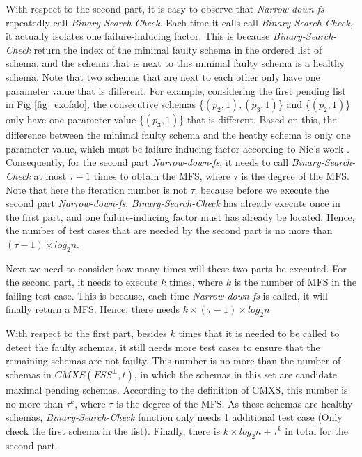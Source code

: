 \documentclass{sig-alternate-05-2015}
\begin{document}
{{{With respect to the second part, it is easy to observe that \emph{Narrow-down-fs} repeatedly call \emph{Binary-Search-Check}. Each time it calls call \emph{Binary-Search-Check}, it actually isolates one failure-inducing factor. This is because \emph{Binary-Search-Check} return the index of the minimal faulty schema in the ordered list of schema, and the schema that is next to this minimal faulty schema is a healthy schema. Note that two schemas that are next to each other only have one parameter value that is different. For example, considering the first pending list in Fig \ref{fig_exofalo}, the consecutive schemas \{$(p_{2}, 1), (p_{3}, 1)$\} and \{$(p_{2}, 1)$\}  only have one parameter value \{$(p_{3}, 1)$\} that is different.  Based on this, the difference between the minimal faulty schema and the heathy schema is only one parameter value, which must be failure-inducing factor according to Nie's work \cite{nie2011minimal}. Consequently, for the second part \emph{Narrow-down-fs}, it needs to call \emph{Binary-Search-Check} at most $\tau - 1$ times to obtain the MFS, where $\tau$ is the degree of the MFS. Note that here the iteration number is not $\tau$, because before we execute the second part \emph{Narrow-down-fs}, \emph{Binary-Search-Check} has already execute once in the first part, and one failure-inducing factor must has already be located. Hence, the number of test cases that are needed by the second part is no more than $(\tau - 1) \times log_{2}n$.


Next we need to consider how many times will these two parts be executed. For the second part, it needs to execute $k$ times, where $k$ is the number of MFS in the failing test case. This is because, each time \emph{Narrow-down-fs} is called, it will finally return a MFS.  Hence, there needs $k \times (\tau - 1) \times log_{2}n$

With respect to the first part, besides $k$ times that it is needed to be called to detect the faulty schemas, it still needs more test cases to ensure that the remaining schemas are not faulty. This number is no more than the number of schemas in $CMXS(FSS^{\bot}, t)$, in which the schemas in this set are candidate maximal pending schemas. According to the definition of CMXS, this number is no more than $\tau^{k}$, where $\tau$ is the degree of the MFS. As these schemas are healthy schemas, \emph{Binary-Search-Check} function only needs 1 additional test case (Only check the first schema in the list). Finally, there is $k \times log_{2}n +  \tau^{k}$ in total for the second part.

}}}
\end{document}
